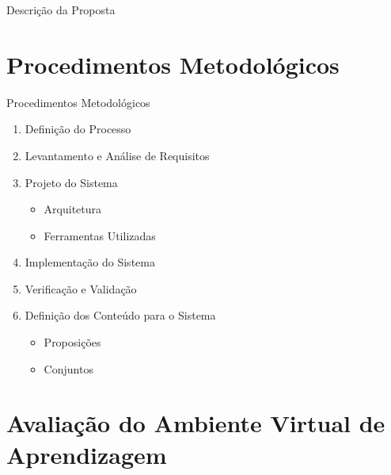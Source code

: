 \documentclass[aspectratio=169]{beamer}
\begin{document}
\begin{frame}{Descrição da Proposta}
\begin{overprint}
\end{overprint}

\end{frame}

\section{Procedimentos Metodológicos}

\begin{frame}{Procedimentos Metodológicos}
	\begin{enumerate}
    	\item Definição do Processo
    	\pause
        \item Levantamento e Análise de Requisitos
		\pause        
        \item Projeto do Sistema
        \pause
        \begin{itemize}
        	\item Arquitetura
        	\pause
        	\item Ferramentas Utilizadas
        	\pause
        \end{itemize}
        \item Implementação do Sistema
        \pause
        \item Verificação e Validação
        \pause
        \item Definição dos Conteúdo para o Sistema
        	\begin{itemize}
        		\item Proposições
        		\item Conjuntos
        	\end{itemize}
    \end{enumerate}
\end{frame}


\section{Avaliação do Ambiente Virtual de Aprendizagem}
\end{document}

